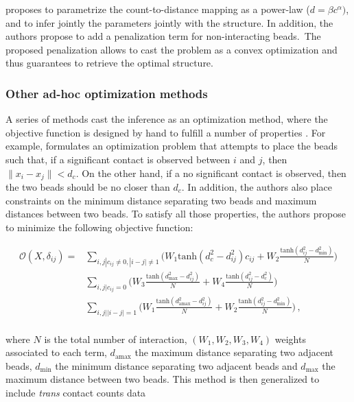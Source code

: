 \documentclass[letterpaper,12pt]{article}
\begin{document}
\citet{zhang:inference} proposes to parametrize the count-to-distance mapping
as a power-law ($d = \beta c^\alpha)$, and to infer jointly the parameters
jointly with the structure. In addition, the authors propose to add a
penalization term for non-interacting beads. The proposed penalization allows
to cast the problem as a convex optimization and thus guarantees to retrieve
the optimal structure.

\subsubsection*{Other ad-hoc optimization methods}

A series of methods cast the inference as an optimization method, where the
objective function is designed by hand to fulfill a number of properties
\citep{trieu:large, trieu:MOGEN, trieu:3D}. For example, \citep{trieu:large}
formulates an optimization problem that attempts to place the beads such that,
if a significant contact is observed between $i$ and $j$, then $\| x_i - x_j
\| < d_c$. On the other hand, if a no significant contact is observed, then
the two beads should be no closer than $d_c$. In addition, the authors also
place constraints on the minimum distance separating two beads and maximum
distances between two beads. To satisfy all those properties, the authors
propose to minimize the following objective function:

\begin{equation*}
\begin{aligned}
\mathcal{O}(X, \delta_{ij}) = & \underset{i, j | c_{ij} \neq 0, |i-j| \neq 1}{\sum} \Bigg(W_1 \text{tanh}(d^2_c -
d^2_{ij}) c_{ij} + W_2 \frac{\text{tanh}(d^2_{ij} - d^2_\text{min})}{N} \Bigg) \\
& \underset{i, j | c_{ij} = 0}{\sum} \Bigg(W_3 \frac{\text{tanh}(d^2_\text{max} -
d^2_{ij})}{N} + W_4 \frac{\text{tanh}(d^2_{ij} -
d^2_{c})}{N}\Bigg) \\
& \underset{i, j | |i - j| = 1}{\sum} \Bigg(W_1 \frac{\text{tanh}(d^2_\text{amax} -
d^2_{ij})}{N} + W_2 \frac{\text{tanh}(d^2_{ij} -
d^2_\text{min})}{N}\Bigg) \,,\\
\end{aligned}
\end{equation*}

where $N$ is the total number of interaction, $(W_1, W_2, W_3, W_4)$ weights
associated to each term, $d_\text{amax}$ the maximum distance separating two
adjacent beads, $d_\text{min}$ the minimum distance separating two adjacent
beads and $d_\text{max}$ the maximum distance between two beads. 
This method is then generalized to include \textit{trans} contact counts data
\citep{trieu:MOGEN}
\end{document}
